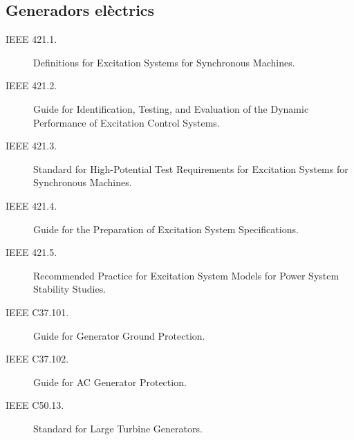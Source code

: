 \subsection*{Generadors elèctrics}
\begin{description}
    \item [\hspace{5mm}IEEE 421.1.] Definitions for Excitation Systems for Synchronous Machines.
    \item [\hspace{5mm}IEEE 421.2.] Guide for Identification, Testing, and Evaluation of the Dynamic Performance of Excitation Control Systems.
    \item [\hspace{5mm}IEEE 421.3.] Standard for High-Potential Test Requirements for Excitation Systems for Synchronous Machines.
    \item [\hspace{5mm}IEEE 421.4.] Guide for the Preparation of Excitation System Specifications.
    \item [\hspace{5mm}IEEE 421.5.] Recommended Practice for Excitation System Models for Power System Stability Studies.
    \item [\hspace{5mm}IEEE C37.101.] Guide for Generator Ground Protection.
    \item [\hspace{5mm}IEEE C37.102.] Guide for AC Generator Protection.
    \item [\hspace{5mm}IEEE C50.13.] Standard for Large Turbine Generators.
\end{description}


